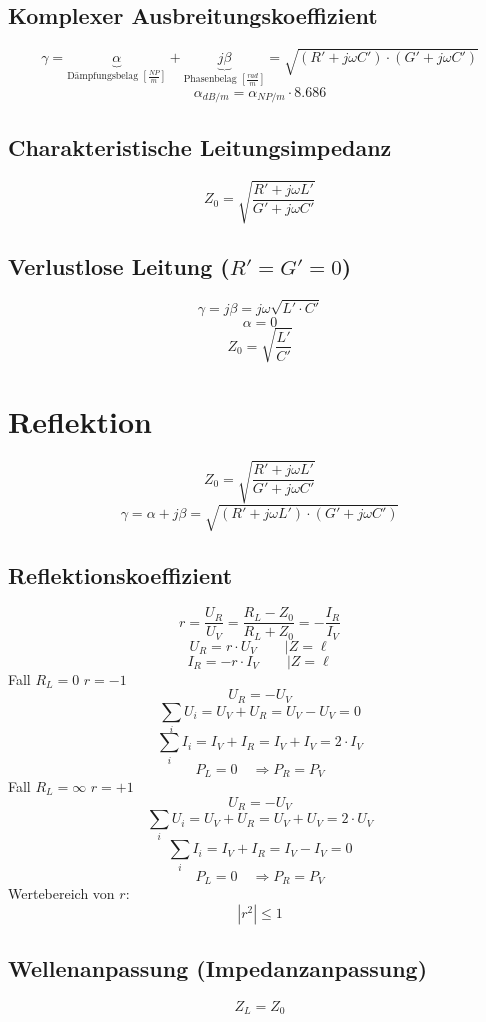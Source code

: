 \documentclass[a4paper, 10pt, fleqn]{article}
\begin{document}
\subsection{Komplexer Ausbreitungskoeffizient}
\[ 
    \gamma 
    = \underbrace{\alpha}_{\text{Dämpfungsbelag }\left[\frac{NP}{m}\right]} 
    + \underbrace{j \beta}_{\text{Phasenbelag }\left[\frac{rad}{m}\right]}
    = \sqrt{(R' + j \omega C') \cdot (G' + j \omega C')}
\]
\[ \alpha_{dB/m} = \alpha_{NP/m} \cdot 8.686 \]

\subsection{Charakteristische Leitungsimpedanz}
\[ Z_0 = \sqrt{\frac{R' + j \omega L'}{G' + j \omega C'}} \]

\subsection{Verlustlose Leitung ($R' = G' = 0$)}
\[ \gamma = j \beta = j \omega \sqrt{L' \cdot C'} \]
\[ \alpha = 0 \]
\[ Z_0 = \sqrt{\frac{L'}{C'}} \]

\section{Reflektion}
\[ Z_0 = \sqrt{\frac{R' + j \omega L'}{G' + j \omega C'}} \]
\[ \gamma = \alpha + j \beta = \sqrt{(R' + j \omega L') \cdot (G' + j \omega C')} \]

\subsection{Reflektionskoeffizient}
\[ r = \frac{U_R}{U_V} = \frac{R_L - Z_0}{R_L + Z_0} = -\frac{I_R}{I_V} \]
\[ U_R =  r \cdot U_V \qquad | Z = \ell \]
\[ I_R = -r \cdot I_V \qquad | Z = \ell \]
Fall $R_L = 0$ $r = -1$
\[ U_R = -U_V \]
\[ \sum\limits_i U_i = U_V + U_R = U_V - U_V = 0 \]
\[ \sum\limits_i I_i = I_V + I_R = I_V + I_V = 2 \cdot I_V \]
\[ P_L = 0 \quad \Rightarrow P_R = P_V \]
Fall $R_L = \infty$ $r = +1$
\[ U_R = -U_V \]
\[ \sum\limits_i U_i = U_V + U_R = U_V + U_V = 2 \cdot U_V \]
\[ \sum\limits_i I_i = I_V + I_R = I_V - I_V = 0 \]
\[ P_L = 0 \quad \Rightarrow P_R = P_V \]
Wertebereich von $r$: 
\[ |r^2| \leq 1 \]

\subsection{Wellenanpassung (Impedanzanpassung)}
\[ Z_L = Z_0 \]
\end{document}

